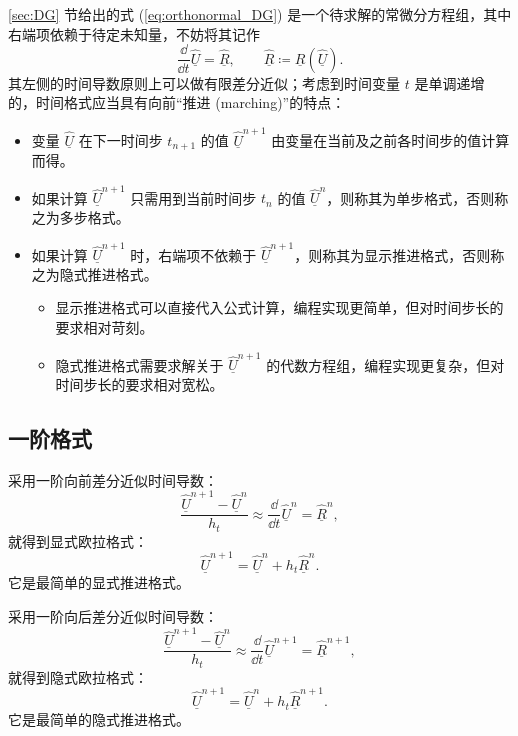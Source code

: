 \ref{sec:DG} 节给出的式 (\ref{eq:orthonormal_DG}) 是一个待求解的常微分方程组，其中右端项依赖于待定未知量，不妨将其记作
\begin{equation}
\frac{\dd}{\dd t}\underline{\hat{U}}=\underline{\hat{R}},\qquad\underline{\hat{R}}\coloneqq\underline{R}(\underline{\hat{U}}).
\end{equation}
其左侧的时间导数原则上可以做有限差分近似；考虑到时间变量 $t$ 是单调递增的，时间格式应当具有向前“推进 (marching)”的特点：
\begin{itemize}
\item 变量 $\underline{\hat{U}}$ 在下一时间步 $t_{n+1}$ 的值 $\underline{\hat{U}}^{n+1}$
由变量在当前及之前各时间步的值计算而得。
\item 如果计算 $\underline{\hat{U}}^{n+1}$ 只需用到当前时间步 $t_{n}$ 的值 $\underline{\hat{U}}^{n}$，则称其为单步格式，否则称之为多步格式。
\item 如果计算 $\underline{\hat{U}}^{n+1}$ 时，右端项不依赖于 $\underline{\hat{U}}^{n+1}$，则称其为显示推进格式，否则称之为隐式推进格式。
\begin{itemize}
\item 显示推进格式可以直接代入公式计算，编程实现更简单，但对时间步长的要求相对苛刻。
\item 隐式推进格式需要求解关于 $\underline{\hat{U}}^{n+1}$ 的代数方程组，编程实现更复杂，但对时间步长的要求相对宽松。
\end{itemize}
\end{itemize}


\subsection{一阶格式}

采用一阶向前差分近似时间导数：
\begin{equation}
\frac{\underline{\hat{U}}^{n+1}-\underline{\hat{U}}^{n}}{h_{t}}\approx\frac{\dd}{\dd t}\underline{\hat{U}}^{n}=\underline{\hat{R}}^{n},
\end{equation}
就得到显式欧拉格式：
\begin{equation}
\underline{\hat{U}}^{n+1}=\underline{\hat{U}}^{n}+h_{t}\underline{\hat{R}}^{n}.\label{eq:Euler}
\end{equation}
它是最简单的显式推进格式。

采用一阶向后差分近似时间导数：
\begin{equation}
\frac{\underline{\hat{U}}^{n+1}-\underline{\hat{U}}^{n}}{h_{t}}\approx\frac{\dd}{\dd t}\underline{\hat{U}}^{n+1}=\underline{\hat{R}}^{n+1},
\end{equation}
就得到隐式欧拉格式：
\begin{equation}
\underline{\hat{U}}^{n+1}=\underline{\hat{U}}^{n}+h_{t}\underline{\hat{R}}^{n+1}.
\end{equation}
它是最简单的隐式推进格式。

